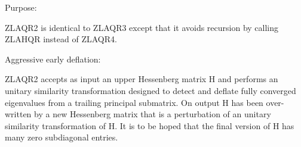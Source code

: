  \begin{DoxyParagraph}{Purpose\+: }
\begin{DoxyVerb}    ZLAQR2 is identical to ZLAQR3 except that it avoids
    recursion by calling ZLAHQR instead of ZLAQR4.

    Aggressive early deflation:

    ZLAQR2 accepts as input an upper Hessenberg matrix
    H and performs an unitary similarity transformation
    designed to detect and deflate fully converged eigenvalues from
    a trailing principal submatrix.  On output H has been over-
    written by a new Hessenberg matrix that is a perturbation of
    an unitary similarity transformation of H.  It is to be
    hoped that the final version of H has many zero subdiagonal
    entries.\end{DoxyVerb}
 
\end{DoxyParagraph}

